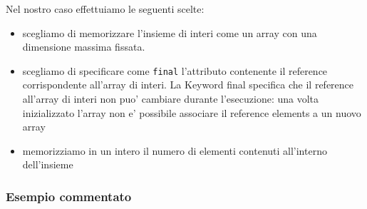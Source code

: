 \documentclass{article}
\begin{document}
Nel nostro caso effettuiamo le seguenti scelte:
\begin{itemize}
\item scegliamo di memorizzare l'insieme di interi come un array con una dimensione massima fissata.
\item scegliamo di specificare come \texttt{final} l'attributo contenente il reference corrispondente all'array di interi. La Keyword final specifica che il reference all'array di interi non puo' cambiare durante l'esecuzione: una volta inizializzato l'array non e' possibile associare il reference elements a un nuovo array 
\item memorizziamo in un intero il numero di elementi contenuti all'interno dell'insieme
\end{itemize}


\subsubsection{Esempio commentato}
\end{document}
